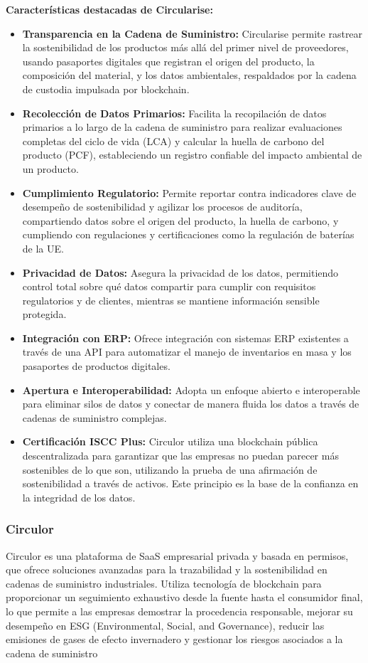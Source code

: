 \documentclass[main.tex]{subfiles}
\begin{document}
\textbf{Características destacadas de Circularise:}
\begin{itemize}
  \item \textbf{Transparencia en la Cadena de Suministro:} Circularise permite rastrear la sostenibilidad de los productos más allá del primer nivel de proveedores, usando pasaportes digitales que registran el origen del producto, la composición del material, y los datos ambientales, respaldados por la cadena de custodia impulsada por blockchain.
  \item \textbf{Recolección de Datos Primarios:} Facilita la recopilación de datos primarios a lo largo de la cadena de suministro para realizar evaluaciones completas del ciclo de vida (LCA) y calcular la huella de carbono del producto (PCF), estableciendo un registro confiable del impacto ambiental de un producto.
  \item \textbf{Cumplimiento Regulatorio:} Permite reportar contra indicadores clave de desempeño de sostenibilidad y agilizar los procesos de auditoría, compartiendo datos sobre el origen del producto, la huella de carbono, y cumpliendo con regulaciones y certificaciones como la regulación de baterías de la UE.
  \item \textbf{Privacidad de Datos:} Asegura la privacidad de los datos, permitiendo control total sobre qué datos compartir para cumplir con requisitos regulatorios y de clientes, mientras se mantiene información sensible protegida.
  \item \textbf{Integración con ERP:} Ofrece integración con sistemas ERP existentes a través de una API para automatizar el manejo de inventarios en masa y los pasaportes de productos digitales.
  \item \textbf{Apertura e Interoperabilidad:} Adopta un enfoque abierto e interoperable para eliminar silos de datos y conectar de manera fluida los datos a través de cadenas de suministro complejas.
  \item \textbf{Certificación ISCC Plus:} Circulor utiliza una blockchain pública descentralizada para garantizar que las empresas no puedan parecer más sostenibles de lo que son, utilizando la prueba de una afirmación de sostenibilidad a través de activos. Este principio es la base de la confianza en la integridad de los datos.
\end{itemize}

\subsubsection{Circulor}
Circulor es una plataforma de SaaS empresarial privada y basada en permisos, que ofrece soluciones avanzadas para la trazabilidad y la sostenibilidad en cadenas de suministro industriales. Utiliza tecnología de blockchain para proporcionar un seguimiento exhaustivo desde la fuente hasta el consumidor final, lo que permite a las empresas demostrar la procedencia responsable, mejorar su desempeño en ESG (Environmental, Social, and Governance), reducir las emisiones de gases de efecto invernadero y gestionar los riesgos asociados a la cadena de suministro \cite{circulor2024}
\end{document}
